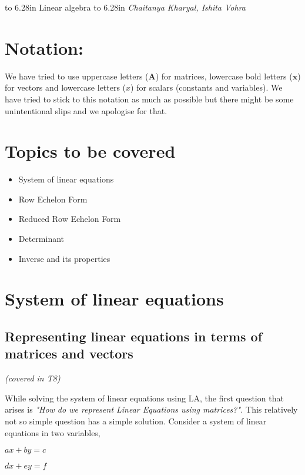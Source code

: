 \documentclass[a4paper]{article}
\begin{document}
\pagestyle{myheadings}
   \thispagestyle{plain}
   \newpage
   \noindent
   \begin{center}
   \framebox
   {
      \vbox{\vspace{2mm}
        \hbox to 6.28in { {\Large \hfill Linear algebra \hfill} } %
        \vspace{2mm}
        \hbox to 6.28in { {\it Chaitanya Kharyal, Ishita Vohra\hfill} } %
        \vspace{2mm}}
   }
   \end{center}
   \markboth{}{} %

\section{Notation:}
We have tried to use uppercase letters ($\mathbf{A}$) for matrices, lowercase bold letters ($\mathbf{x}$) for vectors and lowercase letters ($x$) for scalars (constants and variables). We have tried to stick to this notation as much as possible but there might be some unintentional slips and we apologise for that.

\section{Topics to be covered}
\begin{itemize}
    \item System of linear equations
    \item Row Echelon Form
    \item Reduced Row Echelon Form
    \item Determinant
    \item Inverse and its properties
\end{itemize}

\section{System of linear equations}
\subsection{Representing linear equations in terms of matrices and vectors}
\textit{(covered in T8)}

While solving the system of linear equations using LA, the first question that arises is \textit{"How do we represent Linear Equations using matrices?".} This relatively not so simple question has a simple solution. Consider a system of linear equations in two variables,
\begin{center}
    $ax + by = c$
    
    $dx + ey = f$
\end{center}
\end{document}
